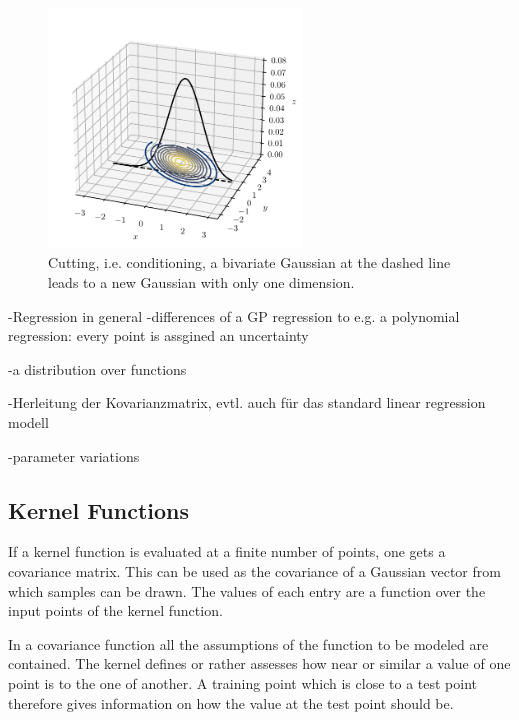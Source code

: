 \documentclass[%
  a4paper,oneside,%
  11pt,%
  smallchapters,
  green,%
  rgb, <cmyk>
  ]{tubsbook}
\begin{document}
%
%
\begin{figure}[h]
\begin{center}
\includegraphics[width=0.6\textwidth]{pics/Gaussians3dCut}
\caption{Cutting, i.e. conditioning, a bivariate Gaussian at the dashed line leads to a new Gaussian with only one dimension.}
\label{fig:GaussCut3d}
\end{center}
\end{figure}



-Regression in general
-differences of a GP regression to e.g. a polynomial regression: every point is assgined an uncertainty

-a distribution over functions

-Herleitung der Kovarianzmatrix, evtl. auch für das standard linear regression modell

-parameter variations

\subsection{Kernel Functions}

If a kernel function is evaluated at a finite number of points, one gets a covariance matrix. This can be used as the covariance of a Gaussian vector from which samples can be drawn. The values of each entry are a function over the input points of the kernel function. \cite[p.14]{rasmussen2006}

In a covariance function all the assumptions of the function to be modeled are contained. The kernel defines or rather assesses how near or similar a value of one point is to the one of another. A training point which is close to a test point therefore gives information on how the value at the test point should be. \cite[p.79]{rasmussen2006}
\end{document}

